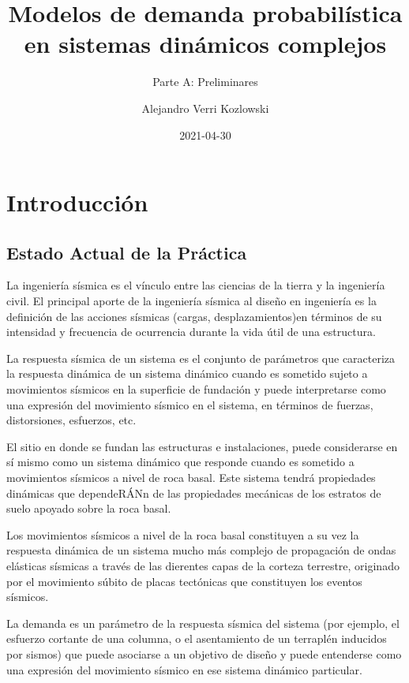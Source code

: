 \documentclass[
]{krantz}
\title{Modelos de demanda probabilística en sistemas dinámicos complejos}
\subtitle{Parte A: Preliminares}
\author{Alejandro Verri Kozlowski}
\date{2021-04-30}
\begin{document}
\maketitle

{
\setcounter{tocdepth}{1}
\tableofcontents
}
\hypertarget{introducciuxf3n}{%
\section*{Introducción}\label{introducciuxf3n}}

\hypertarget{estado-actual-de-la-pruxe1ctica}{%
\subsection*{Estado Actual de la Práctica}\label{estado-actual-de-la-pruxe1ctica}}

La ingeniería sísmica es el vínculo entre las ciencias de la tierra y la ingeniería civil. El principal aporte de la ingeniería sísmica al diseño en ingeniería es la definición de las acciones sísmicas (cargas, desplazamientos)en términos de su intensidad y frecuencia de ocurrencia durante la vida útil de una estructura.

La respuesta sísmica de un sistema es el conjunto de parámetros que caracteriza la respuesta dinámica de un sistema dinámico cuando es sometido sujeto a movimientos sísmicos en la superficie de fundación y puede interpretarse como una expresión del movimiento sísmico en el sistema, en términos de fuerzas, distorsiones, esfuerzos, etc.

El sitio en donde se fundan las estructuras e instalaciones, puede considerarse en sí mismo como un sistema dinámico que responde cuando es sometido a movimientos sísmicos a nivel de roca basal. Este sistema tendrá propiedades dinámicas que dependeRÁNn de las propiedades mecánicas de los estratos de suelo apoyado sobre la roca basal.

Los movimientos sísmicos a nivel de la roca basal constituyen a su vez la respuesta dinámica de un sistema mucho más complejo de propagación de ondas elásticas sísmicas a través de las dierentes capas de la corteza terrestre, originado por el movimiento súbito de placas tectónicas que constituyen los eventos sísmicos.

La demanda es un parámetro de la respuesta sísmica del sistema (por ejemplo, el esfuerzo cortante de una columna, o el asentamiento de un terraplén inducidos por sismos) que puede asociarse a un objetivo de diseño y puede entenderse como una expresión del movimiento sísmico en ese sistema dinámico particular.
\end{document}
